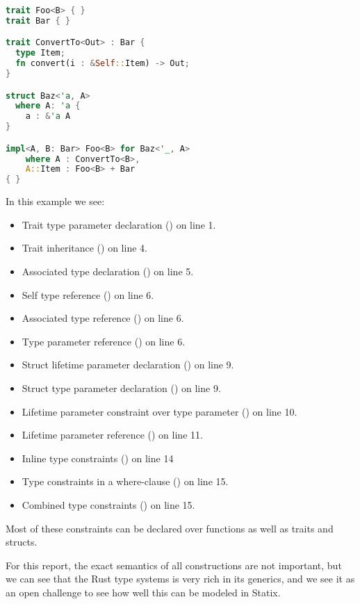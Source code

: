 \begin{lstlisting}[language=rust, showstringspaces=false, escapechar=~, label={lst:param_constraints}, caption={Example of complex parametric constraints}]
trait Foo<B> { }
trait Bar { }

trait ConvertTo<Out> : Bar {
  type Item;
  fn convert(i : &Self::Item) -> Out;
}

struct Baz<'a, A> 
  where A: 'a {
    a : &'a A
}

impl<A, B: Bar> Foo<B> for Baz<'_, A> 
    where A : ConvertTo<B>,
    A::Item : Foo<B> + Bar
{ }
\end{lstlisting}

In this example we see:
\begin{itemize}
    \item Trait type parameter declaration () on line 1.
    \item Trait inheritance () on line 4.
    \item Associated type declaration () on line 5.
    \item Self type reference () on line 6.
    \item Associated type reference () on line 6.
    \item Type parameter reference () on line 6.
    \item Struct lifetime parameter declaration () on line 9.
    \item Struct type parameter declaration () on line 9.
    \item Lifetime parameter constraint over type parameter () on line 10.
    \item Lifetime parameter reference () on line 11.
    \item Inline type constraints () on line 14
    \item Type constraints in a where-clause () on line 15.
    \item Combined type constraints () on line 15.
\end{itemize}

Most of these constraints can be declared over functions as well as traits and structs.

For this report, the exact semantics of all constructions are not important, but we can see that the Rust type systems is very rich in its generics, and we see it as an open challenge to see how well this can be modeled in Statix.

